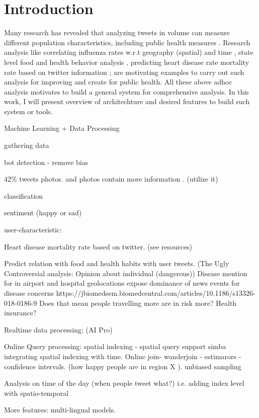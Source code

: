 \section*{Introduction}
\label{sec:intro}
Many research has revealed that analyzing tweets in volume can measure different population characteristics, including public
health measures \cite{paul2011you, paul2012model, eichstaedt2015psychological, barros2018disease, mueller2018crowdbreaks, karami2018characterizing}.
Research analysis like correlating influenza rates w.r.t geography (spatial) and time \cite{signorini2011use}, state level food and health behavior analysis \cite{nguyen2017social}, predicting heart disease rate mortality rate based on twitter information \cite{eichstaedt2015psychological}; are motivating examples to carry out such analysis for improving and create for public health.
All these above adhoc analysis motivates to build a general system for comprehensive analysis.
In this work, I will present overview of architechture and desired features to build such system or tools.




Machine Learning  +  Data Processing

gathering data

bot detection - remove bias


42\% tweets photos. and photos contain more information . (utilize it)

classification

sentiment (happy or sad)

user-characteristic:

Heart disease mortality rate based on twitter. (see resources)

Predict relation with food and health habits with user tweets. (The Ugly Controversial analysis: Opinion about individual (dangerous))
  Disease mention for
  in airport and hospital geolocations expose dominance of news events for disease concerns
  https://jbiomedsem.biomedcentral.com/articles/10.1186/s13326-018-0186-9
  Does that mean people travelling more are in risk more? Health insurance?


Realtime data processing:  (AI Pro)

Online Query processing:
  spatial indexing - spatial query support simba
  integrating spatial indexing with time.
  Online join- wanderjoin - estimarors - confidence intervals. (how happy people  are in region X ).
  unbiased sampling

  Analysis on time of the day  (when people tweet what?) i.e. adding index level with spatio-temporal


More features:
multi-lingual models.





